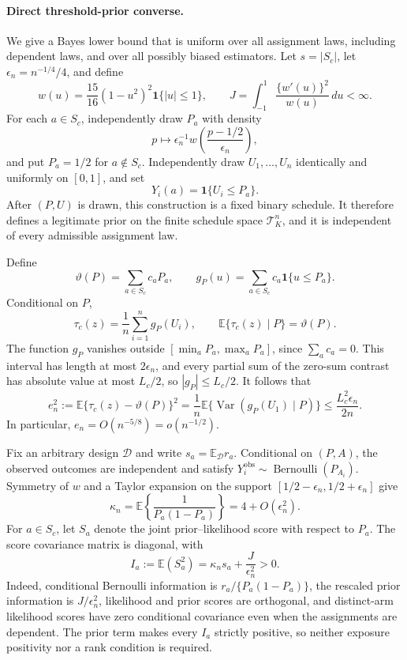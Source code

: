 \paragraph{Direct threshold-prior converse.}
We give a Bayes lower bound that is uniform over all assignment laws, including dependent laws, and
over all possibly biased estimators.  Let \(s=|S_c|\), let \(\epsilon_n=n^{-1/4}/4\), and define
\[
 w(u)=\frac{15}{16}(1-u^2)^2\mathbf 1\{|u|\leq1\},
 \qquad
 J=\int_{-1}^1\frac{\{w'(u)\}^2}{w(u)}\,du<\infty.
\]
For each \(a\in S_c\), independently draw \(P_a\) with density
\[
 p\longmapsto \epsilon_n^{-1}w\!\left(\frac{p-1/2}{\epsilon_n}\right),
\]
and put \(P_a=1/2\) for \(a\notin S_c\).  Independently draw
\(U_1,\ldots,U_n\) identically and uniformly on \([0,1]\), and set
\[
 Y_i(a)=\mathbf 1\{U_i\leq P_a\}.
\]
After \((P,U)\) is drawn, this construction is a fixed binary schedule.  It therefore defines a
legitimate prior on the finite schedule space \(\mathcal T_K^n\), and it is independent of every
admissible assignment law.

Define
\[
 \vartheta(P)=\sum_{a\in S_c}c_aP_a,
 \qquad
 g_P(u)=\sum_{a\in S_c}c_a\mathbf 1\{u\leq P_a\}.
\]
Conditional on \(P\),
\[
 \tau_c(z)=\frac1n\sum_{i=1}^ng_P(U_i),
 \qquad
 \mathbb E\{\tau_c(z)\mid P\}=\vartheta(P).
\]
The function \(g_P\) vanishes outside \([\min_aP_a,\max_aP_a]\), since
\(\sum_a c_a=0\).  This interval has length at most \(2\epsilon_n\), and every partial sum of the
zero-sum contrast has absolute value at most \(L_c/2\), so \(|g_P|\leq L_c/2\).  It follows that
\[
 e_n^2:=\mathbb E\{\tau_c(z)-\vartheta(P)\}^2
 =\frac1n\mathbb E\{\operatorname{Var}(g_P(U_1)\mid P)\}
 \leq\frac{L_c^2\epsilon_n}{2n}.
\]
In particular, \(e_n=O(n^{-5/8})=o(n^{-1/2})\).

Fix an arbitrary design \(\mathcal D\) and write
\(s_a=\mathbb E_{\mathcal D}r_a\).  Conditional on \((P,A)\), the observed outcomes are independent
and satisfy \(Y_i^{\mathrm{obs}}\sim\operatorname{Bernoulli}(P_{A_i})\).  Symmetry of \(w\) and a
Taylor expansion on the support \([1/2-\epsilon_n,1/2+\epsilon_n]\) give
\[
 \kappa_n=\mathbb E\!\left\{\frac1{P_a(1-P_a)}\right\}
 =4+O(\epsilon_n^2).
\]
For \(a\in S_c\), let \(S_a\) denote the joint prior--likelihood score with respect to \(P_a\).
The score covariance matrix is diagonal, with
\[
 I_a:=\mathbb E(S_a^2)=\kappa_ns_a+\frac{J}{\epsilon_n^2}>0.
\]
Indeed, conditional Bernoulli information is \(r_a/\{P_a(1-P_a)\}\), the rescaled prior information
is \(J/\epsilon_n^2\), likelihood and prior scores are orthogonal, and distinct-arm likelihood scores
have zero conditional covariance even when the assignments are dependent.  The prior term makes every
\(I_a\) strictly positive, so neither exposure positivity nor a rank condition is required.

